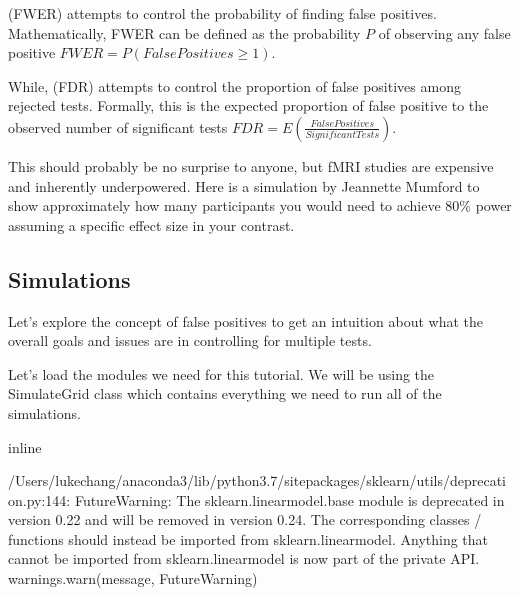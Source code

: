 \documentclass[letterpaper,10pt,english]{sphinxmanual}
\begin{document}
 (FWER) attempts to control the probability of finding  false positives. Mathematically, FWER can be defined as the probability \(P\) of observing any false positive \({FWER} = P({False Positives}\geq 1)\).

While,  (FDR) attempts to control the proportion of false positives among rejected tests. Formally, this is the expected proportion of false positive to the observed number of significant tests \({FDR} = E(\frac{False Positives}{Significant Tests})\).

This should probably be no surprise to anyone, but fMRI studies are expensive and inherently underpowered. Here is a simulation by Jeannette Mumford to show approximately how many participants you would need to achieve 80\% power assuming a specific effect size in your contrast.



\subsection{Simulations}
\label{\detokenize{content/Thresholding_Group_Analyses:simulations}}
Let’s explore the concept of false positives to get an intuition about what the overall goals and issues are in controlling for multiple tests.

Let’s load the modules we need for this tutorial. We will be using the SimulateGrid class which contains everything we need to run all of the simulations.

\begin{sphinxVerbatim}[commandchars=\\\{\}]
 inline

 
 
   
   
   
   
   
   
\end{sphinxVerbatim}

\begin{sphinxVerbatim}[commandchars=\\\{\}]
/Users/lukechang/anaconda3/lib/python3.7/site\PYGZhy{}packages/sklearn/utils/deprecation.py:144: FutureWarning: The sklearn.linear\PYGZus{}model.base module is  deprecated in version 0.22 and will be removed in version 0.24. The corresponding classes / functions should instead be imported from sklearn.linear\PYGZus{}model. Anything that cannot be imported from sklearn.linear\PYGZus{}model is now part of the private API.
  warnings.warn(message, FutureWarning)
\end{sphinxVerbatim}
\end{document}
